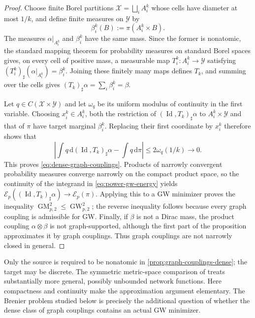 \documentclass[11pt,a4paper]{article}
\theoremstyle{definition}
\theoremstyle{remark}
\newcommand{\Ecal}{\mathcal E}
\newcommand{\Id}{\operatorname{Id}}
\newcommand{\dd}{\,\mathrm d}
\newcommand{\GW}{\operatorname{GW}}
\newcommand{\GM}{\operatorname{GM}}
\begin{document}
\begin{proof}
Choose finite Borel partitions
\(\mathcal X=\bigsqcup_i A_i^k\) whose cells have diameter at most \(1/k\),
and define finite measures on \(\mathcal Y\) by
\begin{equation*}
  \beta_i^k(B):=\pi(A_i^k\times B).
\end{equation*}
The measures \(\alpha|_{A_i^k}\) and \(\beta_i^k\) have the same mass.  Since
the former is nonatomic, the standard mapping theorem for probability
measures on standard Borel spaces
\citep[Theorem~2.1]{DumontLacombeVialard2025} gives, on every cell of positive
mass, a measurable map \(T_i^k:A_i^k\to\mathcal Y\) satisfying
\((T_i^k)_\sharp(\alpha|_{A_i^k})=\beta_i^k\).  Joining these finitely many
maps defines \(T_k\), and summing over the cells gives
\((T_k)_\sharp\alpha=\sum_i\beta_i^k=\beta\).

Let \(q\in C(\mathcal X\times\mathcal Y)\) and let \(\omega_q\) be its
uniform modulus of continuity in the first variable.  Choosing
\(x_i^k\in A_i^k\), both the restriction of
\((\Id,T_k)_\sharp\alpha\) to \(A_i^k\times\mathcal Y\) and that of \(\pi\)
have target marginal \(\beta_i^k\).  Replacing their first coordinate by
\(x_i^k\) therefore shows that
\begin{equation*}
  \left|\int q\dd(\Id,T_k)_\sharp\alpha-\int q\dd\pi\right|
  \leq 2\omega_q(1/k)\longrightarrow0.
\end{equation*}
This proves \eqref{eq:dense-graph-couplings}.  Products of narrowly convergent
probability measures converge narrowly on the compact product space, so the
continuity of the integrand in \eqref{eq:power-gw-energy} yields
\(\Ecal_p((\Id,T_k)_\sharp\alpha)\to\Ecal_p(\pi)\).  Applying this to a GW
minimizer proves the inequality \(\GM_{p,2}^2\leq\GW_{p,2}^2\); the reverse
inequality follows because every graph coupling is admissible for GW.
Finally, if \(\beta\) is not a Dirac mass, the product coupling
\(\alpha\otimes\beta\) is not graph-supported, although the first part of the
proposition approximates it by graph couplings.  Thus graph couplings are not
narrowly closed in general.
\end{proof}

Only the source is required to be nonatomic in
\cref{prop:graph-couplings-dense}; the target may be discrete.  The symmetric
metric-space comparison of \citet{MemoliNeedham2024} treats substantially more
general, possibly unbounded network functions.  Here compactness and
continuity make the approximation argument elementary.  The Brenier problem
studied below is precisely the additional question of whether the dense class
of graph couplings contains an actual GW minimizer.
\end{document}
